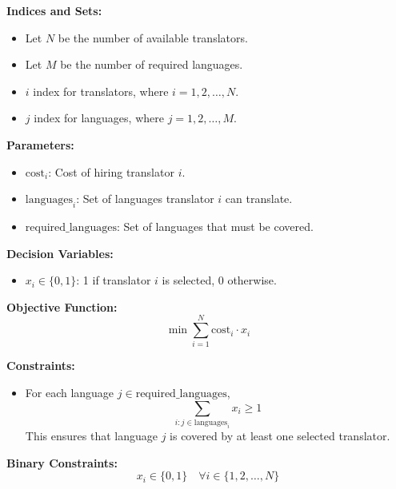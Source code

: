 \documentclass{article}
\begin{document}
\textbf{Indices and Sets:}
\begin{itemize}
    \item Let \( N \) be the number of available translators.
    \item Let \( M \) be the number of required languages.
    \item \( i \) index for translators, where \( i = 1, 2, \ldots, N \).
    \item \( j \) index for languages, where \( j = 1, 2, \ldots, M \).
\end{itemize}

\textbf{Parameters:}
\begin{itemize}
    \item \( \text{cost}_i \): Cost of hiring translator \( i \).
    \item \( \text{languages}_i \): Set of languages translator \( i \) can translate.
    \item \( \text{required\_languages} \): Set of languages that must be covered.
\end{itemize}

\textbf{Decision Variables:}
\begin{itemize}
    \item \( x_i \in \{0, 1\} \): 1 if translator \( i \) is selected, 0 otherwise.
\end{itemize}

\textbf{Objective Function:}
\[
\min \sum_{i=1}^{N} \text{cost}_i \cdot x_i
\]

\textbf{Constraints:}
\begin{itemize}
    \item {} \newline
    For each language \( j \in \text{required\_languages} \),
    \[
    \sum_{i: j \in \text{languages}_i} x_i \geq 1
    \]
    This ensures that language \( j \) is covered by at least one selected translator.
\end{itemize}

\textbf{Binary Constraints:}
\[
x_i \in \{0, 1\} \quad \forall i \in \{1, 2, \ldots, N\}
\]
\end{document}
